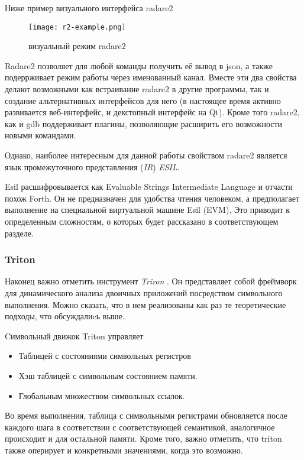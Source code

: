 Ниже пример визуального интерфейса radare2

\begin{figure}[h]
\centering
\texttt{[image: r2-example.png]}
\caption{визуальный режим radare2}
\label{fig:r2a}
\end{figure}

\bigskip

Radare2 позволяет для любой команды получить её вывод в json, а также подеррживает режим работы через именованный канал. Вместе эти два свойства делают возможными как встраивание radare2 в другие программы, так и создание альтернативных интерфейсов для него (в настоящее время активно развивается веб-интерфейс, и декстопный интерфейс на Qt).
Кроме того radare2, как и gdb поддерживает плагины, позволяющие расширить его возможности новыми командами.

Однако, наиболее интересным для данной работы свойством radare2 является язык промежуточного представления ({\em IR}) {\em ESIL}.

Esil расшифровывается как Evaluable Strings Intermediate Language и отчасти похож Forth. Он не предназначен для удобства чтения человеком, а предполагает выполнение на специальной виртуальной машине Esil (EVM).
Это приводит к определенным сложностям, о которых будет рассказано в соответствующем разделе.

\subsubsection{Triton}

Наконец важно отметить инструмент {\em Triron} \cite{Triton}. Он представляет собой фреймворк для динамического анализа двоичных приложений посредством символьного выполнения. Можно сказать, что в нем реализованы как раз те теоретические подходы, что обсуждалиcь выше.

Cимвольный движок Triton управляет

\begin{itemize}
\item Таблицей с состояниями символьных регистров

\item Хэш таблицей с символьным состоянием памяти.

\item Глобальным множеством символьных ссылок.

\end{itemize}

Во время выполнения, таблица с символьными регистрами обновляется после каждого шага в соответствии с соответствующей семантикой, аналогичное происходит и для остальной памяти. Кроме того, важно отметить, что triton также оперирует и конкретными значениями, когда это возможно.



